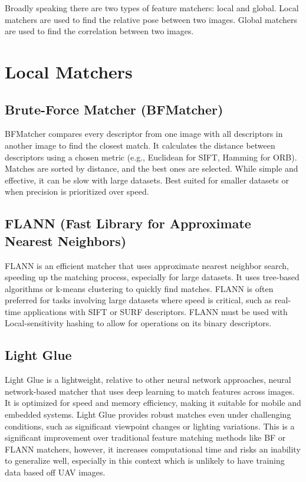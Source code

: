 
Broadly speaking there are two types of feature matchers: local and global. Local matchers are used to find the relative pose between two images. Global matchers are used to find the correlation between two images.

\section*{Local Matchers}
\subsection*{Brute-Force Matcher (BFMatcher)} BFMatcher compares every descriptor from one image with all descriptors in another image to find the closest match. It calculates the distance between descriptors using a chosen metric (e.g., Euclidean for SIFT, Hamming for ORB). Matches are sorted by distance, and the best ones are selected. While simple and effective, it can be slow with large datasets. Best suited for smaller datasets or when precision is prioritized over speed.

\subsection*{FLANN (Fast Library for Approximate Nearest Neighbors)} FLANN is an efficient matcher that uses approximate nearest neighbor search, speeding up the matching process, especially for large datasets. It uses tree-based algorithms or k-means clustering to quickly find matches. FLANN is often preferred for tasks involving large datasets where speed is critical, such as real-time applications with SIFT or SURF descriptors. FLANN must be used with Local-sensitivity hashing to allow for operations on its binary descriptors. 

\subsection*{Light Glue} Light Glue is a lightweight, relative to other neural network approaches, neural network-based matcher that uses deep learning to match features across images. It is optimized for speed and memory efficiency, making it suitable for mobile and embedded systems. Light Glue provides robust matches even under challenging conditions, such as significant viewpoint changes or lighting variations. This is a significant improvement over traditional feature matching methods like BF or FLANN matchers, however, it increases computational time and risks an inability to generalize well, especially in this context which is unlikely to have training data based off UAV images.

